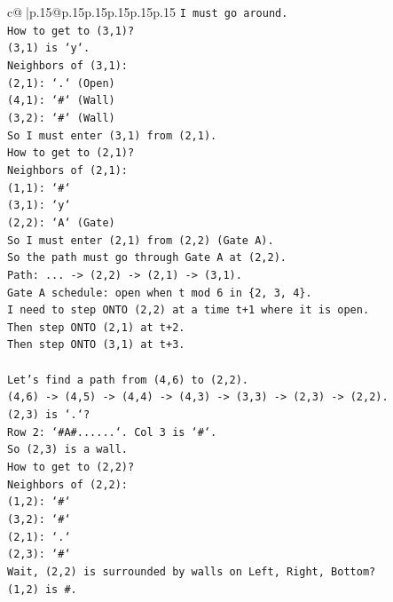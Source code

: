\documentclass{article}
\begin{document}
{\begin{supertabular}{c@{$\;$}|p{.15\linewidth}@{}p{.15\linewidth}p{.15\linewidth}p{.15\linewidth}p{.15\linewidth}p{.15\linewidth}}
{{{\texttt{I must go around.} \\
\texttt{How to get to (3,1)?} \\
\texttt{(3,1) is `y`.} \\
\texttt{Neighbors of (3,1):} \\
\texttt{(2,1): `.` (Open)} \\
\texttt{(4,1): `\#` (Wall)} \\
\texttt{(3,2): `\#` (Wall)} \\
\texttt{So I must enter (3,1) from (2,1).} \\
\texttt{How to get to (2,1)?} \\
\texttt{Neighbors of (2,1):} \\
\texttt{(1,1): `\#`} \\
\texttt{(3,1): `y`} \\
\texttt{(2,2): `A` (Gate)} \\
\texttt{So I must enter (2,1) from (2,2) (Gate A).} \\
\texttt{So the path must go through Gate A at (2,2).} \\
\texttt{Path: ... {-}> (2,2) {-}> (2,1) {-}> (3,1).} \\
\texttt{Gate A schedule: open when t mod 6 in \{2, 3, 4\}.} \\
\texttt{I need to step ONTO (2,2) at a time t+1 where it is open.} \\
\texttt{Then step ONTO (2,1) at t+2.} \\
\texttt{Then step ONTO (3,1) at t+3.} \\
\\ 
\texttt{Let's find a path from (4,6) to (2,2).} \\
\texttt{(4,6) {-}> (4,5) {-}> (4,4) {-}> (4,3) {-}> (3,3) {-}> (2,3) {-}> (2,2).} \\
\texttt{(2,3) is `.`?} \\
\texttt{Row 2: `\#A\#......`. Col 3 is `\#`.} \\
\texttt{So (2,3) is a wall.} \\
\texttt{How to get to (2,2)?} \\
\texttt{Neighbors of (2,2):} \\
\texttt{(1,2): `\#`} \\
\texttt{(3,2): `\#`} \\
\texttt{(2,1): `.`} \\
\texttt{(2,3): `\#`} \\
\texttt{Wait, (2,2) is surrounded by walls on Left, Right, Bottom?} \\
\texttt{(1,2) is \#.} \\
}}}
\end{supertabular}}
\end{document}
